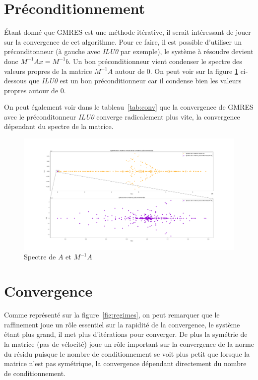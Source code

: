 \documentclass{article}[11pt]
\begin{document}
\section{Préconditionnement}
\label{sec:preconditionnement}

Étant donné que GMRES est une méthode itérative, il serait intéressant de jouer sur la convergence de cet algorithme. Pour ce faire, il est possible d'utiliser un préconditonneur (à gauche avec \textit{ILU0} par exemple), le système à résoudre devient donc $M^{-1}Ax=M^{-1}b$. Un bon préconditionneur vient condenser le spectre des valeurs propres de la matrice $M^{-1}A$ autour de 0. On peut voir sur la figure \ref{fig:spectrum} ci-dessous que \textit{ILU0} est un bon préconditionneur car il condense bien les valeurs propres autour de 0.

On peut également voir dans le tableau~\ref{tab:conv} que la convergence de GMRES avec le préconditonneur \textit{ILU0} converge radicalement plus vite, la convergence dépendant du spectre de la matrice.

\begin{figure}[H]
	\centering
	\includegraphics[width=.8\textwidth]{res/plots/spectrum.png}
	\caption{Spectre de $A$ et $M^{-1}A$}
	\label{fig:spectrum}
\end{figure}

\section{Convergence}
\label{sec:convergence}

Comme représenté sur la figure~\ref{fig:regimes}, on peut remarquer que le raffinement joue un rôle essentiel sur la rapidité de la convergence, le système étant plus grand, il met plus d'itérations pour converger. De plus la symétrie de la matrice (pas de vélocité) joue un rôle important sur la convergence de la norme du résidu puisque le nombre de conditionnement se voit plus petit que lorsque la matrice n'est pas symétrique, la convergence dépendant directement du nombre de conditionnement.
\end{document}
